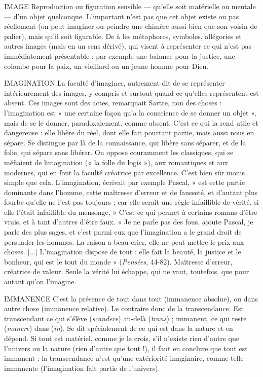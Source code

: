 IMAGE Reproduction ou figuration sensible — qu’elle soit matérielle ou
mentale — d’un objet quelconque. L'important n’est pas que cet
objet existe ou pas réellement (on peut imaginer ou peindre une chimère aussi
bien que son voisin de palier), mais qu’il soit figurable. De à les métaphores,
symboles, allégories et autres images (mais en un sens dérivé), qui visent à
représenter ce qui n’est pas immédiatement présentable : par exemple une
balance pour la justice, une colombe pour la paix, un vieillard ou un jeune
homme pour Dieu.

IMAGINATION La faculté d’imaginer, autrement dit de se représenter
intérieurement des images, y compris et surtout quand ce
qu’elles représentent est absent. Ces images sont des actes, remarquait Sartre,
non des choses : l’imagination est « une certaine façon qu’a la conscience de se
donner un objet », mais de se le donner, paradoxalement, comme absent. C’est
ce qui la rend utile et dangereuse : elle libère du réel, dont elle fait pourtant
partie, mais aussi nous en sépare. Se distingue par là de la connaissance, qui
libère sans séparer, et de la folie, qui sépare sans libérer.
On oppose couramment les classiques, qui se méfiaient de limagination
(« la folle du logis »), aux romantiques et aux modernes, qui en font la faculté
créatrice par excellence. C’est bien sûr moins simple que cela. L'imagination,
écrivait par exemple Pascal, « est cette partie dominante dans l’homme, cette
maîtresse d’erreur et de fausseté, et d’autant plus fourbe qu’elle ne l’est pas
toujours ; car elle serait une règle infaillible de vérité, si elle l'était infaillible du
mensonge, » C'est ce qui permet à certains romans d’être vrais, et à tant
d’autres d’être faux. « Je ne parle pas des fous, ajoute Pascal, je parle des plus
sages, et c’est parmi eux que l'imagination a le grand droit de persuader les
hommes. La raison a beau crier, elle ne peut mettre le prix aux choses. [...]
L’imagination dispose de tout : elle fait la beauté, la justice et le bonheur, qui
est le tout du monde » ({\it Pensées}, 44-82). Maîtresse d’erreur, créatrice de valeur.
Seule la vérité lui échappe, qui ne vaut, toutefois, que pour autant qu’on l’imagine.

IMMANENCE C'est la présence de tout dans tout (immanence absolue), ou
dans autre chose (immanence relative). Le contraire donc de
la transcendance. Est transcendant ce qui s'élève ({\it scandere}) au-delà ({\it trans}) ;
immanent, ce qui reste ({\it manere}) dans ({\it in}). Se dit spécialement de ce qui est
dans la nature et en dépend. Si tout est matériel, comme je le crois, s’il n'existe
rien d’autre que l'univers ou la nature (rien d’autre que tout !), il faut en
conclure que tout est immanent : la transcendance n’est qu’une extériorité imaginaire,
comme telle immanente (l'imagination fait partie de l’univers).

